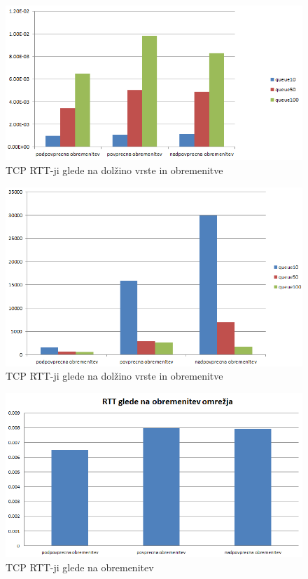 \documentclass[11pt, a4paper, slovene]{book}
\begin{document}
\begin{figure}[h]
	\centering
	\includegraphics[width=\textwidth]{TCP_RTT_VRSTA_OBREMENITEV.png}
	\caption{TCP RTT-ji glede na dolžino vrste in obremenitve}
	\label{2}	
\end{figure}

\begin{figure}[h]
	\centering
	\includegraphics[width=\textwidth]{IZGUBE_PAKETOV_VRSTA_OBREMENITEV.png}
	\caption{TCP RTT-ji glede na dolžino vrste in obremenitve}
	\label{6}	
\end{figure}

\begin{figure}[h]
	\centering
	\includegraphics[width=\textwidth]{TCP_RTT_obremenitev_omrezja.png}
	\caption{TCP RTT-ji glede na obremenitev}
	\label{3}	
\end{figure}
\end{document}
